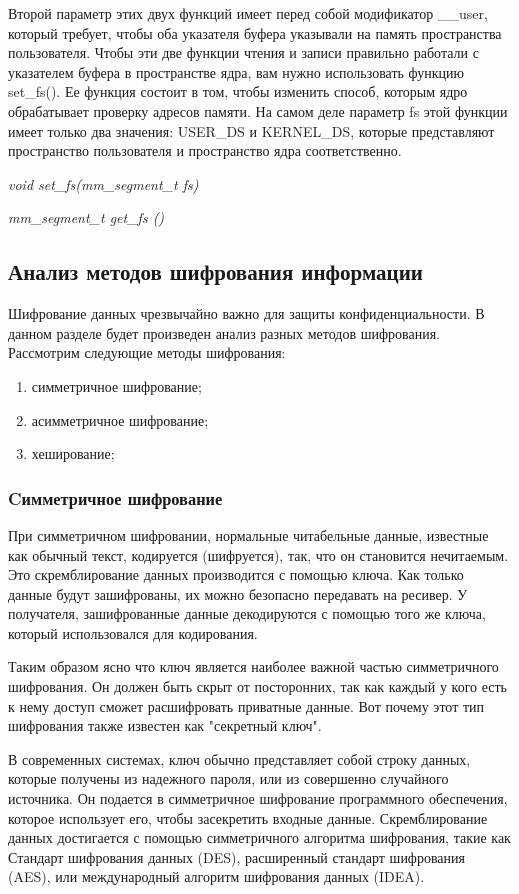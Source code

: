 \documentclass[a4paper, 10pt]{article}
\begin{document}
	Второй параметр этих двух функций имеет перед собой модификатор \_\_user, который требует, чтобы оба указателя буфера указывали на память пространства пользователя. Чтобы эти две функции чтения и записи правильно работали с указателем буфера в пространстве ядра, вам нужно использовать функцию set\_fs(). Ее функция состоит в том, чтобы изменить способ, которым ядро обрабатывает проверку адресов памяти. На самом деле параметр fs этой функции имеет только два значения: USER\_DS и KERNEL\_DS, которые представляют пространство пользователя и пространство ядра соответственно.
	
	\textit{void set\_fs(mm\_segment\_t fs)}
	
	\textit{mm\_segment\_t  get\_fs ()}
	
	\subsection{Анализ методов шифрования информации}
	Шифрование данных чрезвычайно важно для защиты конфиденциальности. В данном разделе будет произведен анализ разных методов шифрования. Рассмотрим следующие методы шифрования:
	\begin{enumerate}
		\item симметричное шифрование;
		\item асимметричное шифрование;
		\item хеширование;
	\end{enumerate}
	\subsubsection{Cимметричное шифрование}
	\hspace*{5mm}При симметричном шифровании, нормальные читабельные данные, известные как обычный текст, кодируется (шифруется), так, что он становится нечитаемым. Это скремблирование данных производится с помощью ключа. Как только данные будут зашифрованы, их можно безопасно передавать на ресивер. У получателя, зашифрованные данные декодируются с помощью того же ключа, который использовался для кодирования. 
	
	Таким образом ясно что ключ является наиболее важной частью симметричного шифрования. Он должен быть скрыт от посторонних, так как каждый у кого есть к нему доступ сможет расшифровать приватные данные. Вот почему этот тип шифрования также известен как "секретный ключ". 
	
	В современных системах, ключ обычно представляет собой строку данных, которые получены из надежного пароля, или из совершенно случайного источника. Он подается в симметричное шифрование программного обеспечения, которое использует его, чтобы засекретить входные данные. Скремблирование данных достигается с помощью симметричного алгоритма шифрования, такие как Стандарт шифрования данных (DES), расширенный стандарт шифрования (AES), или международный алгоритм шифрования данных (IDEA).
	
\end{document}
